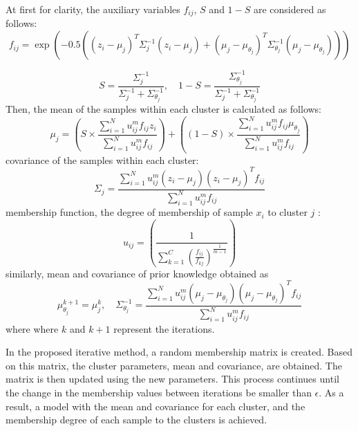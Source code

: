 \documentclass{article}
\begin{document}
At first for clarity, the auxiliary variables $f_{ij}$, $S$ and $1-S$ are considered as follows:
\begin{equation}\label{eq: aux f}
    f_{ij} = \exp \left( -0.5 \left( (z_i - \mu_j)^T \Sigma_j^{-1} (z_i - \mu_j) + (\mu_j - \mu_{\theta_j})^T \Sigma_{\theta_j}^{-1} (\mu_j - \mu_{\theta_j}) \right) \right)
\end{equation}


\begin{equation}\label{eq: aux S}
    S = \frac{\Sigma_j^{-1}}{\Sigma_j^{-1} + \Sigma_{\theta_j}^{-1}}, \quad 1 - S = \frac{\Sigma_{\theta_j}^{-1}}{\Sigma_j^{-1} + \Sigma_{\theta_j}^{-1}}
\end{equation}
Then, the mean of the samples within each cluster is calculated as follows:
\begin{equation}\label{eq: update mean}
    \mu_j = \left( S \times \frac{\sum_{i=1}^{N} u_{ij}^{m} f_{ij} z_i}{\sum_{i=1}^{N} u_{ij}^{m} f_{ij}} \right) 
+ \left( (1-S) \times \frac{\sum_{i=1}^{N} u_{ij}^{m} f_{ij} \mu_{\theta_j}}{\sum_{i=1}^{N} u_{ij}^{m} f_{ij}} \right)
\end{equation}
covariance of the samples within each cluster: 
\begin{equation}\label{eq:update cov}
    \Sigma_j = \frac{\sum_{i=1}^{N} u_{ij}^{m} (z_i - \mu_j) (z_i - \mu_j)^T f_{ij}}{\sum_{i=1}^{N} u_{ij}^{m} f_{ij}}
\end{equation}
membership function, the degree of membership of sample $x_i$ to cluster $j$ :
\begin{equation}\label{eq:update u}
    u_{ij} = \left( \frac{1}{\sum_{k=1}^{C} \left( \frac{f_{ij}}{f_{kj}} \right)^{\frac{1}{m-1}}} \right)
\end{equation}
similarly, mean and covariance of prior knowledge obtained as
\begin{equation}\label{eq:update prior}
    \mu_{\theta_j}^{k+1} = \mu_j^{k} , \quad \Sigma_{\theta_j}^{-1} = \frac{\sum_{i=1}^{N} u_{ij}^{m} (\mu_j - \mu_{\theta_j}) (\mu_j - \mu_{\theta_j})^T f_{ij}}{\sum_{i=1}^{N} u_{ij}^{m} f_{ij}}
\end{equation}
where where $k$ and $k+1$ represent the iterations.

In the proposed iterative method, a random membership matrix is created. Based on this matrix, the cluster parameters, mean and covariance, are obtained. The matrix is then updated using the new parameters. This process continues until the change in the membership values between iterations be smaller than $\epsilon$. As a result, a model with the mean and covariance for each cluster, and the membership degree of each sample to the clusters is achieved.
\end{document}
